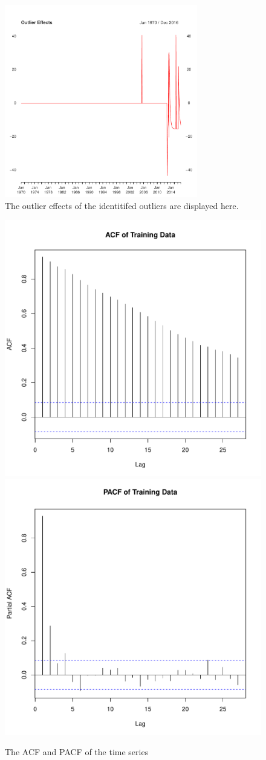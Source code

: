 \documentclass{paper}
\begin{document}
\begin{figure}
\centering
    \includegraphics[width=0.75\textwidth]{../image/outlier_effects.pdf}
\caption{The outlier effects of the identitifed outliers are displayed here.}
\label{outlier}
\end{figure}



\begin{figure}
\centering
\includegraphics[width=0.45\linewidth]{../image/acf_og.pdf}
\includegraphics[width=0.45\linewidth]{../image/pacf_og.pdf}
\caption{The ACF and PACF of the time series}
\label{og_acf_pacf}
\end{figure}
\end{document}
